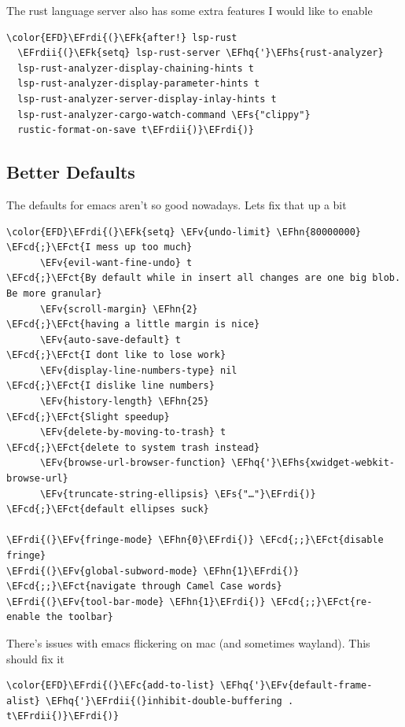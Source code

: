 \documentclass{scrartcl}
\newcommand{\EFk}[1]{\textcolor{EFk}{#1}} %
\newcommand{\EFs}[1]{\textcolor{EFs}{#1}} %
\newcommand{\EFct}[1]{\textcolor{EFct}{#1}} %
\newcommand{\EFc}[1]{\textcolor{EFc}{#1}} %
\newcommand{\EFv}[1]{\textcolor{EFv}{#1}} %
\newcommand{\EFcd}[1]{\textcolor{EFcd}{#1}} %
\newcommand{\EFhn}[1]{#1} %
\newcommand{\EFhq}[1]{#1} %
\newcommand{\EFhs}[1]{#1} %
\newcommand{\EFrdi}[1]{#1} %
\newcommand{\EFrdii}[1]{#1} %
\begin{document}
The rust language server also has some extra features I would like to enable
\begin{Code}
\begin{Verbatim}[]
\color{EFD}\EFrdi{(}\EFk{after!} lsp-rust
  \EFrdii{(}\EFk{setq} lsp-rust-server \EFhq{'}\EFhs{rust-analyzer}
  lsp-rust-analyzer-display-chaining-hints t
  lsp-rust-analyzer-display-parameter-hints t
  lsp-rust-analyzer-server-display-inlay-hints t
  lsp-rust-analyzer-cargo-watch-command \EFs{"clippy"}
  rustic-format-on-save t\EFrdii{)}\EFrdi{)}
\end{Verbatim}
\end{Code}

\subsection{Better Defaults}
\label{sec:org5ac4c74}
The defaults for emacs aren't so good nowadays. Lets fix that up a bit
\begin{Code}
\begin{Verbatim}[]
\color{EFD}\EFrdi{(}\EFk{setq} \EFv{undo-limit} \EFhn{80000000}                          \EFcd{;}\EFct{I mess up too much}
      \EFv{evil-want-fine-undo} t                        \EFcd{;}\EFct{By default while in insert all changes are one big blob. Be more granular}
      \EFv{scroll-margin} \EFhn{2}                              \EFcd{;}\EFct{having a little margin is nice}
      \EFv{auto-save-default} t                          \EFcd{;}\EFct{I dont like to lose work}
      \EFv{display-line-numbers-type} nil                \EFcd{;}\EFct{I dislike line numbers}
      \EFv{history-length} \EFhn{25}                            \EFcd{;}\EFct{Slight speedup}
      \EFv{delete-by-moving-to-trash} t                  \EFcd{;}\EFct{delete to system trash instead}
      \EFv{browse-url-browser-function} \EFhq{'}\EFhs{xwidget-webkit-browse-url}
      \EFv{truncate-string-ellipsis} \EFs{"…"}\EFrdi{)}                \EFcd{;}\EFct{default ellipses suck}

\EFrdi{(}\EFv{fringe-mode} \EFhn{0}\EFrdi{)} \EFcd{;;}\EFct{disable fringe}
\EFrdi{(}\EFv{global-subword-mode} \EFhn{1}\EFrdi{)} \EFcd{;;}\EFct{navigate through Camel Case words}
\EFrdi{(}\EFv{tool-bar-mode} \EFhn{1}\EFrdi{)} \EFcd{;;}\EFct{re-enable the toolbar}
\end{Verbatim}
\end{Code}

There's issues with emacs flickering on mac (and sometimes wayland). This should
fix it
\begin{Code}
\begin{Verbatim}[]
\color{EFD}\EFrdi{(}\EFc{add-to-list} \EFhq{'}\EFv{default-frame-alist} \EFhq{'}\EFrdii{(}inhibit-double-buffering . t\EFrdii{)}\EFrdi{)}
\end{Verbatim}
\end{Code}
\end{document}
